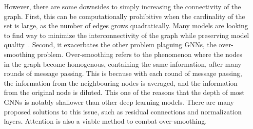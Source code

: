 However, there are some downsides to simply increasing the connectivity of the graph.
First, this can be computationally prohibitive when the cardinality of the set is large, as the number of edges grows quadratically.
Many models are looking to find way to minimize the interconnectivity of the graph while preserving model quality~.
Second, it exacerbates the other problem plaguing GNNs, the over-smoothing problem.
Over-smoothing refers to the phenomenon where the nodes in the graph become homogenous, containing the same information, after many rounds of message passing.
This is because with each round of message passing, the information from the neighbouring nodes is averaged, and the information from the original node is diluted.
This one of the reasons that the depth of most GNNs is notably shallower than other deep learning models.
There are many proposed solutions to this issue, such as residual connections and normalization layers.
Attention is also a viable method to combat over-smoothing.


